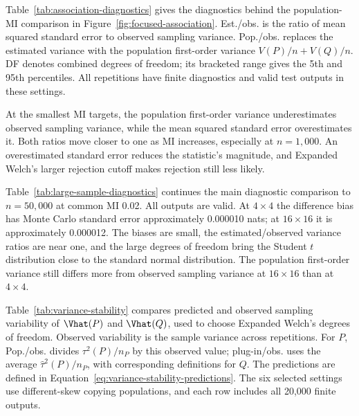 Table~\ref{tab:association-diagnostics} gives the diagnostics behind
the population-MI comparison in Figure~\ref{fig:focused-association}.
Est./obs. is the ratio of mean squared
standard error to observed sampling variance. Pop./obs. replaces the
estimated variance with the population first-order variance
\(V(P)/n+V(Q)/n\). DF denotes combined degrees of freedom; its bracketed
range gives the 5th and 95th percentiles. All repetitions have finite
diagnostics and valid test outputs in these settings.

\begin{table}[H]
\centering
\small
\caption{Diagnostics for \(4\times4\) different-skew populations with equal MI.}
\label{tab:association-diagnostics}

\end{table}

At the smallest MI targets, the population first-order variance
underestimates observed sampling variance, while the mean squared standard
error overestimates it. Both ratios move closer to one as MI increases,
especially at \(n=1{,}000\). An overestimated standard error reduces the
statistic's magnitude, and Expanded Welch's larger rejection cutoff makes
rejection still less likely.

Table~\ref{tab:large-sample-diagnostics} continues the main diagnostic
comparison to \(n=50{,}000\) at common MI 0.02. All outputs are valid.
At \(4\times4\) the difference bias has Monte Carlo standard error
approximately 0.000010 nats; at \(16\times16\) it is approximately
0.000012. The biases are small, the estimated/observed variance ratios
are near one, and the large degrees of freedom bring the Student \(t\)
distribution close to the standard normal distribution. The population
first-order variance still differs more from observed sampling variance
at \(16\times16\) than at \(4\times4\).

\begin{table}[H]
\centering
\small
\caption{Different-skew null diagnostics at \(n=50{,}000\).}
\label{tab:large-sample-diagnostics}

\end{table}

\medskip
{}

Table~\ref{tab:variance-stability} compares predicted and observed sampling
variability of \(\Vhat(P)\) and \(\Vhat(Q)\), used to choose Expanded
Welch's degrees of freedom. Observed variability is the sample variance
across repetitions. For \(P\), Pop./obs. divides \(\tau^2(P)/n_P\)
by this observed value; plug-in/obs. uses the average
\(\widehat\tau^2(P)/n_P\), with corresponding definitions for \(Q\).
The predictions are defined
in Equation~\eqref{eq:variance-stability-predictions}. The six selected
settings use different-skew copying populations, and each row includes
all 20,000 finite outputs.

